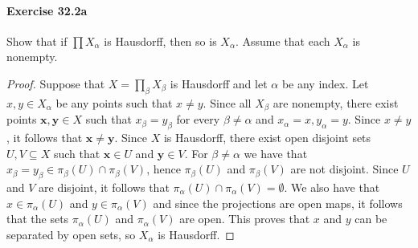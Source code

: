 \documentclass{article}
\begin{document}
\paragraph{Exercise 32.2a} Show that if $\prod X_\alpha$ is Hausdorff, then so is $X_\alpha$. Assume that each $X_\alpha$ is nonempty.
\begin{proof}
    Suppose that $X=\prod_\beta X_\beta$ is Hausdorff and let $\alpha$ be any index.
Let $x, y \in X_\alpha$ be any points such that $x \neq y$. Since all $X_\beta$ are nonempty, there exist points $\mathbf{x}, \mathbf{y} \in X$ such that $x_\beta=y_\beta$ for every $\beta \neq \alpha$ and $x_\alpha=x, y_\alpha=y$.
Since $x \neq y$, it follows that $\mathbf{x} \neq \mathbf{y}$. Since $X$ is Hausdorff, there exist open disjoint sets $U, V \subseteq X$ such that $\mathbf{x} \in U$ and $\mathbf{y} \in V$.
For $\beta \neq \alpha$ we have that $x_\beta=y_\beta \in \pi_\beta(U) \cap \pi_\beta(V)$, hence $\pi_\beta(U)$ and $\pi_\beta(V)$ are not disjoint.
Since $U$ and $V$ are disjoint, it follows that $\pi_\alpha(U) \cap \pi_\alpha(V)=\emptyset$.
We also have that $x \in \pi_\alpha(U)$ and $y \in \pi_\alpha(V)$ and since the projections are open maps, it follows that the sets $\pi_\alpha(U)$ and $\pi_\alpha(V)$ are open.
This proves that $x$ and $y$ can be separated by open sets, so $X_\alpha$ is Hausdorff.
\end{proof}
\end{document}
